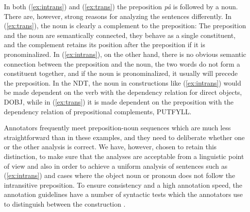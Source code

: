 \documentclass[11pt,a4paper]{article}
\begin{document}
In both (\ref{ex:intrans}) and (\ref{ex:trans}) the preposition \emph{på} is followed by a noun. There are, however, strong reasons for analyzing the sentences differently. In (\ref{ex:trans}), the noun is clearly a complement to the preposition: The preposition and the noun are semantically connected, they behave as a single constituent, and the complement retains its position after the preposition if it is pronominalized. In (\ref{ex:intrans}), on the other hand, there is no obvious semantic connection between the preposition and the noun, the two words do not form a constituent together, and if the noun is pronominalized, it usually will precede the preposition. In the NDT, the noun in constructions like (\ref{ex:intrans}) would be made dependent on the verb with the dependency relation for direct objects, DOBJ, while in (\ref{ex:trans}) it is made dependent on the preposition with the dependency relation of prepositional complements, PUTFYLL.

Annotators frequently meet preposition-noun sequences which are much less straightforward than in these examples, and they need to deliberate whether one or the other analysis is correct. We have, however, chosen to retain this distinction, to make sure that the analyses are acceptable from a linguistic point of view and also in order to achieve a uniform analysis of sentences such as (\ref{ex:intrans}) and cases where the object noun or pronoun does not follow the intransitive preposition. To ensure consistency and a high annotation speed, the annotation guidelines have a number of syntactic tests which the annotators use to distinguish between the construction \cite[54-56]{Kin:Sol:Eri:2013}.
\end{document}
